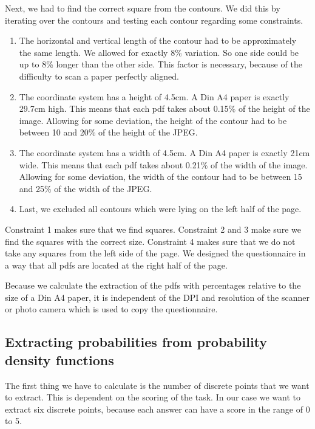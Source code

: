 \documentclass[../main/main.tex]{subfiles}
\begin{document}
	Next, we had to find the correct square from the contours. We did this by iterating over the contours and testing each contour regarding some constraints.
	
	\begin{enumerate}
		\item The horizontal and vertical length of the contour had to be approximately the same length. We allowed for exactly 8\% variation. So one side could be up to 8\% longer than the other side. This factor is necessary, because of the difficulty to scan a paper perfectly aligned.
		\item The coordinate system has a height of 4.5cm. A Din A4 paper is exactly 29.7cm high. This means that each pdf takes about 0.15\% of the height of the image. Allowing for some deviation, the height of the contour had to be between 10 and 20\% of the height of the JPEG. 
		\item The coordinate system has a width of 4.5cm. A Din A4 paper is exactly 21cm wide. This means that each pdf takes about 0.21\% of the width of the image. Allowing for some deviation, the width of the contour had to be between 15 and 25\% of the width of the JPEG. 
		\item Last, we excluded all contours which were lying on the left half of the page.
	\end{enumerate}

	\noindent Constraint 1 makes sure that we find squares. Constraint 2 and 3 make sure we find the squares with the correct size. Constraint 4 makes sure that we do not take any squares from the left side of the page. We designed the questionnaire in a way that all pdfs are located at the right half of the page.
	
	Because we calculate the extraction of the pdfs with percentages relative to the size of a Din A4 paper, it is independent of the DPI and resolution of the scanner or photo camera which is used to copy the questionnaire.
	
	\subsection{Extracting probabilities from probability density functions}
	
	The first thing we have to calculate is the number of discrete points that we want to extract. This is dependent on the scoring of the task. In our case we want to extract six discrete points, because each answer can have a score in the range of 0 to 5. 
	
\end{document}
